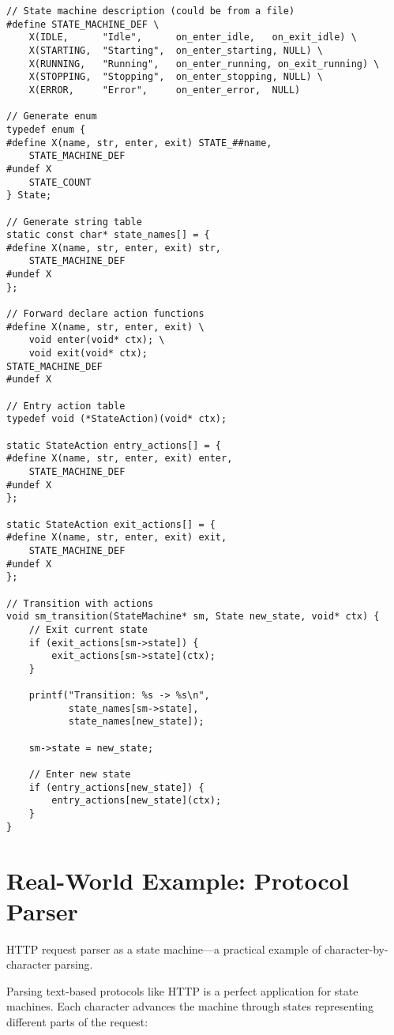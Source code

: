 \begin{lstlisting}
// State machine description (could be from a file)
#define STATE_MACHINE_DEF \
    X(IDLE,      "Idle",      on_enter_idle,   on_exit_idle) \
    X(STARTING,  "Starting",  on_enter_starting, NULL) \
    X(RUNNING,   "Running",   on_enter_running, on_exit_running) \
    X(STOPPING,  "Stopping",  on_enter_stopping, NULL) \
    X(ERROR,     "Error",     on_enter_error,  NULL)

// Generate enum
typedef enum {
#define X(name, str, enter, exit) STATE_##name,
    STATE_MACHINE_DEF
#undef X
    STATE_COUNT
} State;

// Generate string table
static const char* state_names[] = {
#define X(name, str, enter, exit) str,
    STATE_MACHINE_DEF
#undef X
};

// Forward declare action functions
#define X(name, str, enter, exit) \
    void enter(void* ctx); \
    void exit(void* ctx);
STATE_MACHINE_DEF
#undef X

// Entry action table
typedef void (*StateAction)(void* ctx);

static StateAction entry_actions[] = {
#define X(name, str, enter, exit) enter,
    STATE_MACHINE_DEF
#undef X
};

static StateAction exit_actions[] = {
#define X(name, str, enter, exit) exit,
    STATE_MACHINE_DEF
#undef X
};

// Transition with actions
void sm_transition(StateMachine* sm, State new_state, void* ctx) {
    // Exit current state
    if (exit_actions[sm->state]) {
        exit_actions[sm->state](ctx);
    }

    printf("Transition: %s -> %s\n",
           state_names[sm->state],
           state_names[new_state]);

    sm->state = new_state;

    // Enter new state
    if (entry_actions[new_state]) {
        entry_actions[new_state](ctx);
    }
}
\end{lstlisting}

\section{Real-World Example: Protocol Parser}

HTTP request parser as a state machine---a practical example of character-by-character parsing.

Parsing text-based protocols like HTTP is a perfect application for state machines. Each character advances the machine through states representing different parts of the request:

